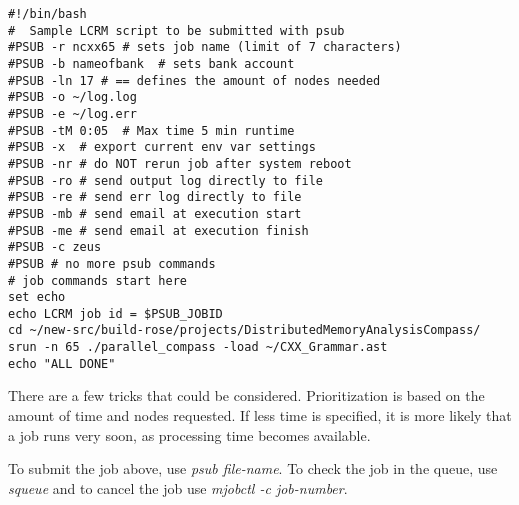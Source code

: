 \begin{verbatim}
#!/bin/bash
#  Sample LCRM script to be submitted with psub
#PSUB -r ncxx65 # sets job name (limit of 7 characters)
#PSUB -b nameofbank  # sets bank account
#PSUB -ln 17 # == defines the amount of nodes needed
#PSUB -o ~/log.log
#PSUB -e ~/log.err
#PSUB -tM 0:05  # Max time 5 min runtime
#PSUB -x  # export current env var settings
#PSUB -nr # do NOT rerun job after system reboot
#PSUB -ro # send output log directly to file
#PSUB -re # send err log directly to file
#PSUB -mb # send email at execution start
#PSUB -me # send email at execution finish
#PSUB -c zeus
#PSUB # no more psub commands
# job commands start here
set echo
echo LCRM job id = $PSUB_JOBID
cd ~/new-src/build-rose/projects/DistributedMemoryAnalysisCompass/
srun -n 65 ./parallel_compass -load ~/CXX_Grammar.ast
echo "ALL DONE"
\end{verbatim} 

There are a few tricks that could be considered.
Prioritization is based on the amount of time and nodes requested. If less time
is specified, it is more likely that a job runs very soon, as processing time
becomes available.

To submit the job above, use \emph{psub file-name}.
To check the job in the queue, use \emph{squeue} and to cancel the job use \emph{mjobctl -c job-number}.




